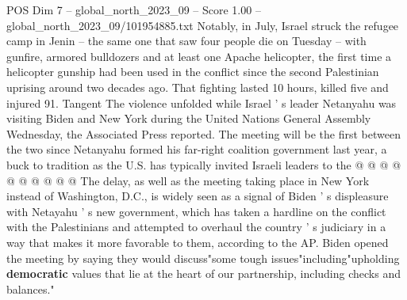 \begin{textsample}{POS Dim 7 – global\_north\_2023\_09 – Score 1.00 – global\_north\_2023\_09/101954885.txt}
Notably, in July, Israel struck the refugee camp in Jenin -- the same one that saw four people die on Tuesday -- with gunfire, armored bulldozers and at least one Apache helicopter, the first time a helicopter gunship had been used in the conflict since the second Palestinian uprising around two decades ago.
That fighting lasted 10 hours, killed five and injured 91.
Tangent The violence unfolded while Israel ' s leader Netanyahu was visiting Biden and New York during the United Nations General Assembly Wednesday, the Associated Press reported.
The meeting will be the first between the two since Netanyahu formed his far-right coalition government last year, a buck to tradition as the U.S. has typically invited Israeli leaders to the @ @ @ @ @ @ @ @ @ @ The delay, as well as the meeting taking place in New York instead of Washington, D.C., is widely seen as a signal of Biden ' s displeasure with Netayahu ' s new government, which has taken a hardline on the conflict with the Palestinians and attempted to overhaul the country ' s judiciary in a way that makes it more favorable to them, according to the AP.
Biden opened the meeting by saying they would discuss"some tough issues"including"upholding \textbf{democratic} values that lie at the heart of our partnership, including checks and balances."

\end{textsample}
